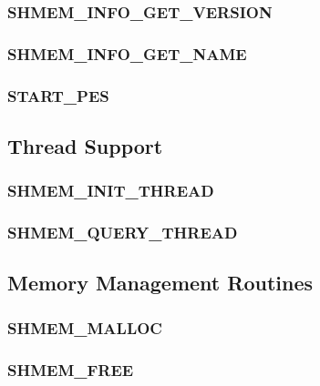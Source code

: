 \documentclass[10pt,oneside]{book}
\begin{document}
\subsubsection{\textbf{SHMEM\_INFO\_GET\_VERSION}}\label{subsec:shmem_info_get_version}


\subsubsection{\textbf{SHMEM\_INFO\_GET\_NAME}}\label{subsec:shmem_info_get_name}


\subsubsection{\textbf{START\_PES}}\label{subsec:start_pes}


\subsection{Thread Support}
\label{subsec:thread_support}


\subsubsection{\textbf{SHMEM\_INIT\_THREAD}}
\label{subsec:shmem_init_thread}


\subsubsection{\textbf{SHMEM\_QUERY\_THREAD}}
\label{subsec:shmem_query_thread}



\subsection{Memory Management Routines}
\label{sec:memory_management}


\subsubsection{\textbf{SHMEM\_MALLOC}}\label{subsec:shmem_malloc}


\subsubsection{\textbf{SHMEM\_FREE}}\label{subsec:shmem_free}

\end{document}

